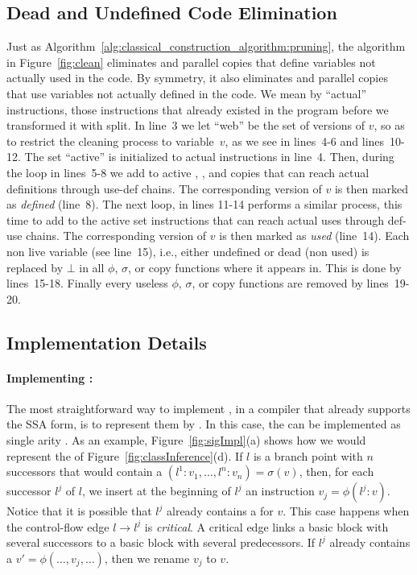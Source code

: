 {\subsection{Dead and Undefined Code Elimination}

Just as Algorithm~\ref{alg:classical_construction_algorithm:pruning}, the algorithm in Figure~\ref{fig:clean} eliminates \phifuns and parallel copies that define variables not actually used in the code. By symmetry, it also eliminates \sigmafuns  and parallel copies  that use variables not actually defined in the code.
We mean by ``actual'' instructions, those instructions that already existed in the program before we transformed it with \textsf{split}.
In line~3 we let ``web'' be the set of versions of $v$, so as to restrict the cleaning process to variable~$v$, as we see in lines~4-6 and lines~10-12.
The set ``active'' is initialized to actual instructions in line~4.
Then, during the loop in lines~5-8 we add to active \phifuns, \sigmafuns, and copies that can reach actual definitions through use-def chains.
The corresponding version of $v$ is then marked as \emph{defined} (line~8).
The next loop, in lines 11-14 performs a similar process, this time to add to the active set instructions that can reach actual uses through def-use chains.
The corresponding version of $v$ is then marked as \emph{used} (line~14).
Each non live variable (see line~15), i.e., either undefined or dead (non used) is replaced by $\bot$ in all $\phi$, $\sigma$, or copy functions where it appears in.
This is done by lines~15-18.
Finally every useless $\phi$, $\sigma$, or copy functions are removed by lines~19-20. 

\subsection{Implementation Details}
\label{sub:special}

\paragraph{Implementing \sigmafuns: }
The most straightforward way to implement \sigmafuns, in a compiler that already supports the SSA form, is to represent them by \phifuns.
In this case, the \sigmafuns can be implemented as single arity \phifuns.
As an example, Figure~\ref{fig:sigImpl}(a) shows how we would represent the \sigmafuns of Figure~\ref{fig:classInference}(d). 
If $l$ is a branch point with $n$ successors that would contain a \sigmafun $(l^1:v_1, \ldots, l^n:v_n) =\sigma(v)$, then, for each successor $l^j$ of $l$, we insert at the beginning of $l^j$ an instruction $v_j = \phi(l^j:v)$.
Notice that it is possible that $l^j$ already contains a \phifun for $v$.
This case happens when the control-flow edge $l \rightarrow l^j$ is {\em critical}.
A critical edge links a basic block with several successors to a basic block with several predecessors.
If $l^j$ already contains a \phifun $v' = \phi(\ldots, v_j, \ldots)$, then we rename $v_j$ to $v$.

}
